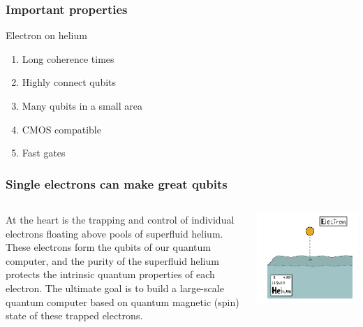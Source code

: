 \documentclass{beamer}
\begin{document}
\begin{frame}
\frametitle{Important properties}

\begin{block}{Electron on helium}
\begin{enumerate}
\item Long coherence times

\item Highly connect qubits

\item Many qubits in a small area

\item CMOS compatible

\item Fast gates
\end{enumerate}
\end{block}
\end{frame}



\frame
    {
      \frametitle{Single electrons can make great qubits}
	
      \begin{footnotesize}
     \begin{columns}
       \column{5.0cm}

       At the heart is the trapping and control
       of individual electrons floating above pools of superfluid
       helium. These electrons form the qubits of our quantum
       computer, and the purity of the superfluid helium protects the
       intrinsic quantum properties of each electron. The  ultimate
       goal is to build a large-scale quantum computer based on
       quantum magnetic (spin) state of these trapped electrons.
\column{5cm}
      \begin{center}
	\includegraphics[width=1.2\textwidth]{qcfigures/nordicquantumfig1.png}
      \end{center}
\end{columns}
      \end{footnotesize}
    }
\end{document}
